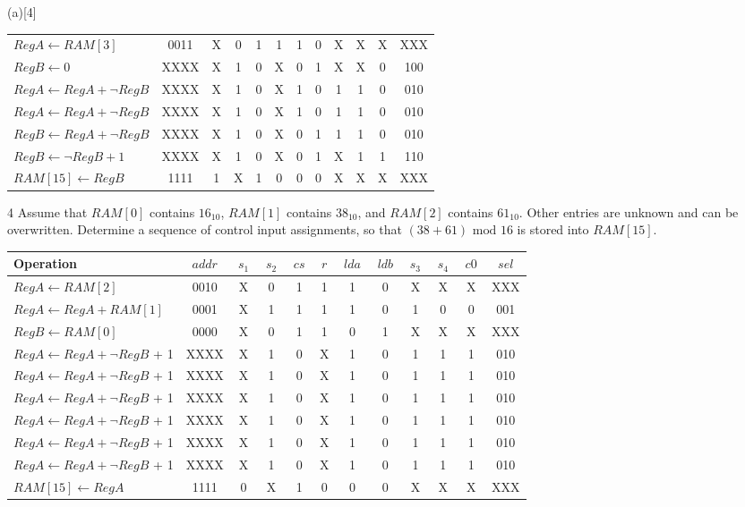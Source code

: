 \begin{question}{(a)}[4]
{\begin{Questions}
\begin{tabular}{p{4.3cm} | c | c | c | c | c | c | c | c | c | c | c}
  \hline
  $RegA \leftarrow RAM\left[3\right]$ & 0011 & X & 0 & 1 & 1 & 1 & 0 & X & X & X & XXX \\
  $RegB \leftarrow 0 $ & XXXX & X & 1 & 0 & X & 0 & 1 & X & X & 0 & 100 \\
  $RegA \leftarrow RegA + \lnot RegB$ & XXXX & X & 1 & 0 & X & 1 & 0 & 1 & 1 & 0 & 010 \\
  $RegA \leftarrow RegA + \lnot RegB$ & XXXX & X & 1 & 0 & X & 1 & 0 & 1 & 1 & 0 & 010 \\
  $RegB \leftarrow RegA + \lnot RegB$ & XXXX & X & 1 & 0 & X & 0 & 1 & 1 & 1 & 0 & 010 \\
  $RegB \leftarrow \lnot RegB + 1$ & XXXX & X & 1 & 0 & X & 0 & 1 & X & 1 & 1 & 110 \\
  $ RAM\left[15\right] \leftarrow RegB$ & 1111 & 1 & X & 1 & 0 & 0 & 0 & X & X & X & XXX \\
  \end{tabular}
 \end{Questions}
 }
 \item[4] Assume that $RAM\left[0\right]$ contains $16_{10}$, $RAM\left[1\right]$ contains $38_{10}$, and $RAM\left[2\right]$ contains $61_{10}$. Other entries are unknown and can be overwritten. Determine a sequence of control input assignments, so that $(38 + 61) \text{ mod } 16$ is stored into $RAM\left[15\right]$.\\
 {\color{NavyBlue}
 \begin{Questions}
  \begin{tabular}{p{4.7cm} | c | c | c | c | c | c | c | c | c | c | c}
  Operation & $\, addr \,$ & $\, s_1 \,$ & $\, s_2 \,$ & $\, cs \,$ & $\, r \,$ & $\, lda \,$ & $\, ldb \,$ & $\, s_3 \,$ & $\, s_4 \,$ & $\, c0 \,$ & $\, sel \,$ \\
  \hline$RegA \leftarrow RAM\left[2\right]$ & 0010 & X & 0 & 1 & 1 & 1 & 0 & X & X & X & XXX \\
  $RegA \leftarrow RegA + RAM\left[1\right]$ & 0001 & X & 1 & 1 & 1 & 1 & 0 & 1 & 0 & 0 & 001 \\
  $RegB \leftarrow RAM\left[0\right]$ & 0000 & X & 0 & 1 & 1 & 0 & 1 & X & X & X & XXX \\
  $RegA \leftarrow RegA + \lnot RegB$ + 1& XXXX & X & 1 & 0 & X & 1 & 0 & 1 & 1 & 1 & 010 \\
  $RegA \leftarrow RegA + \lnot RegB$ + 1& XXXX & X & 1 & 0 & X & 1 & 0 & 1 & 1 & 1 & 010 \\
  $RegA \leftarrow RegA + \lnot RegB$ + 1& XXXX & X & 1 & 0 & X & 1 & 0 & 1 & 1 & 1 & 010 \\
  $RegA \leftarrow RegA + \lnot RegB$ + 1& XXXX & X & 1 & 0 & X & 1 & 0 & 1 & 1 & 1 & 010 \\
  $RegA \leftarrow RegA + \lnot RegB$ + 1& XXXX & X & 1 & 0 & X & 1 & 0 & 1 & 1 & 1 & 010 \\
  $RegA \leftarrow RegA + \lnot RegB$ + 1& XXXX & X & 1 & 0 & X & 1 & 0 & 1 & 1 & 1 & 010 \\
  $ RAM\left[15\right] \leftarrow RegA$ & 1111 & 0 & X & 1 & 0 & 0 & 0 & X & X & X & XXX \\
    

\end{tabular}
\end{Questions}}
\end{question}
